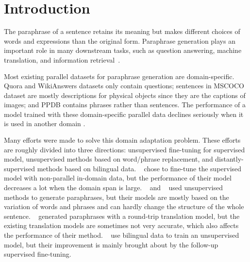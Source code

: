 \section{Introduction}
The paraphrase of a sentence retains its meaning but makes different choices
of words and expressions than the original form. 
Paraphrase generation plays an important role in many downstream tasks, 
such as question answering, machine translation, and information 
retrieval~\cite{hu2019improved}. 

Most existing parallel datasets for paraphrase generation are 
domain-specific. Quora and WikiAnswers \cite{fader2013paraphrase} datasets 
only contain questions; sentences in MSCOCO \cite{lin2014microsoft} dataset 
are mostly descriptions for physical objects since they are the captions of 
images; 
and PPDB \cite{ganitkevitch2013ppdb} contains phrases rather than sentences. 
The performance of a model trained with these domain-specific parallel data 
declines seriously when it is used in another domain \cite{li2019decomposable}. 

Many efforts were made to solve this domain adaptation problem. These efforts are roughly divided into three directions: unsupervised fine-tuning for supervised model, unsupervised methods based on word/phrase replacement, and distantly-supervised methods based on bilingual data.
\citeauthor{li2019decomposable}~ chose to fine-tune the supervised model with non-parallel in-domain data, but the performance of their model decreases a lot when the domain span is large.
\citeauthor{liu2019unsupervised}~ and \citeauthor{miao2019cgmh}~ used unsupervised methods to generate paraphrases, but their models are mostly based on the variation of 
words and phrases and can hardly change the structure of the whole sentence. 
\citeauthor{wieting2017paranmt}~ generated paraphrases with a round-trip translation model, but the existing translation models are sometimes not very accurate, which also affects the performance of their method. \citeauthor{liu2020exploring}~ use bilingual data to train an unsupervised model, but their improvement is mainly brought about by the follow-up supervised fine-tuning.

